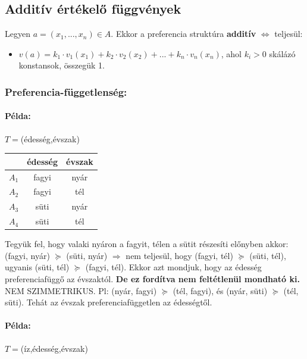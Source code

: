 \documentclass[a4paper,12pt]{article}
\begin{document}
\subsection{Additív értékelő függvények}

Legyen $a=(x_1, ... , x_n) \in A$. Ekkor a preferencia struktúra \textbf{additív} $\Leftrightarrow$ teljesül:
\begin{itemize}
\item $v(a) = k_1 \cdot v_1(x_1) + k_2 \cdot v_2(x_2) + ... + k_n \cdot v_n(x_n)$, ahol $k_i > 0$ skálázó konstansok, összegük 1.
\end{itemize}

\subsubsection{Preferencia-függetlenség: }

\paragraph{Példa:}  $T=$(édesség,évszak)

\begin{center}
\begin{tabular}{c||c|c}
 & édesség& évszak \\
 \hline
 $A_1$& fagyi & nyár \\
 $A_2$& fagyi & tél \\
 $A_3$& süti & nyár \\
 $A_4$& süti & tél \\
\end{tabular}
\end{center}

Tegyük fel, hogy valaki nyáron a fagyit, télen a sütit részesíti előnyben akkor:
(fagyi, nyár) $\succeq$ (süti, nyár) $\Rightarrow$ nem teljesül, hogy (fagyi, tél) $\succeq$ (süti, tél),
ugyanis (süti, tél) $\succeq$ (fagyi, tél).
Ekkor azt mondjuk, hogy az édesség preferenciafüggő az évszaktól.
\textbf{De ez fordítva nem feltétlenül mondható ki.} NEM SZIMMETRIKUS.
Pl: (nyár, fagyi) $\succeq$ (tél, fagyi), és (nyár, süti) $\succeq$ (tél, süti).
Tehát az évszak preferenciafüggetlen az édességtől.


\paragraph{Példa:}  $T=$(íz,édesség,évszak)
\end{document}
